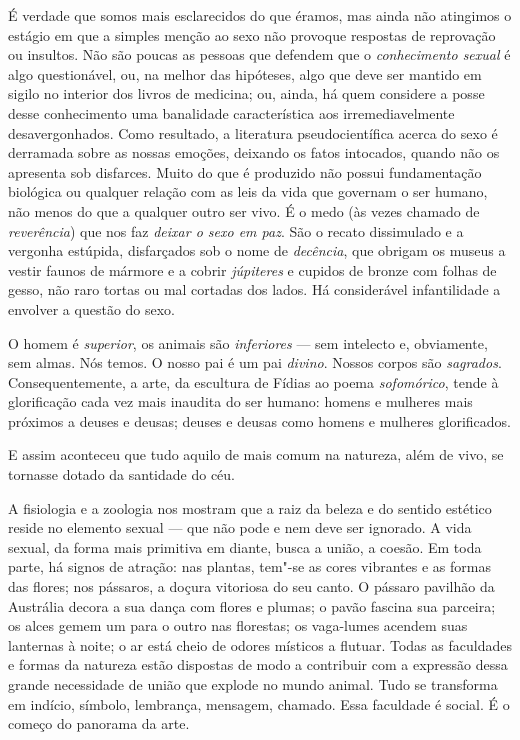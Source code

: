 É verdade que somos mais esclarecidos do que éramos, mas ainda não
atingimos o estágio em que a simples menção ao sexo não provoque
respostas de reprovação ou insultos. Não são poucas as pessoas que
defendem que o \textit{conhecimento sexual} é algo questionável, ou, na
melhor das hipóteses, algo que deve ser mantido em sigilo no interior
dos livros de medicina; ou, ainda, há quem considere a posse desse
conhecimento uma banalidade característica aos irremediavelmente
desavergonhados. Como resultado, a literatura pseudocientífica acerca do
sexo é derramada sobre as nossas emoções, deixando os fatos
intocados, quando não os apresenta sob disfarces. Muito do que é
produzido não possui fundamentação biológica ou qualquer relação com as
leis da vida que governam o ser humano, não menos do que a qualquer outro ser
vivo. É o medo (às vezes chamado de \textit{reverência}) que nos faz \textit{deixar
o sexo em paz}. São o recato dissimulado e a vergonha estúpida,
disfarçados sob o nome de \textit{decência}, que obrigam os museus a vestir
faunos de mármore e a cobrir \textit{júpiteres} e cupidos de bronze com folhas de
gesso, não raro tortas ou mal cortadas dos lados. Há considerável
infantilidade a envolver a questão do sexo.

O homem é \textit{superior}, os animais são \textit{inferiores} --- sem intelecto
e, obviamente, sem almas. Nós temos. O nosso pai é um pai
\textit{divino}. Nossos corpos são \textit{sagrados}. Consequentemente, a arte, da
escultura de Fídias ao poema \textit{sofomórico},
tende à glorificação cada vez mais inaudita do ser humano: homens e mulheres
mais próximos a deuses e deusas; deuses e deusas como homens e mulheres
glorificados.

E assim aconteceu que tudo aquilo de mais comum na natureza, além de
vivo, se tornasse dotado da santidade do céu.


A fisiologia e a zoologia nos mostram que a raiz da beleza e do sentido
estético reside no elemento sexual --- que não pode e nem deve ser
ignorado. A vida sexual, da forma mais primitiva em diante, busca a
união, a coesão. Em toda parte, há signos de atração: nas plantas,
tem"-se as cores vibrantes e as formas das flores; nos pássaros, a doçura
vitoriosa do seu canto. O pássaro pavilhão da Austrália decora a sua
dança com flores e plumas; o pavão fascina sua parceira; os alces
gemem um para o outro nas florestas; os vaga-lumes acendem suas lanternas
à noite; o ar está cheio de odores místicos a flutuar. Todas as
faculdades e formas da natureza estão dispostas de modo a contribuir com
a expressão dessa grande necessidade de união que explode no mundo
animal. Tudo se transforma em indício, símbolo, lembrança, mensagem,
chamado. Essa faculdade é social. É o começo do panorama da arte.

